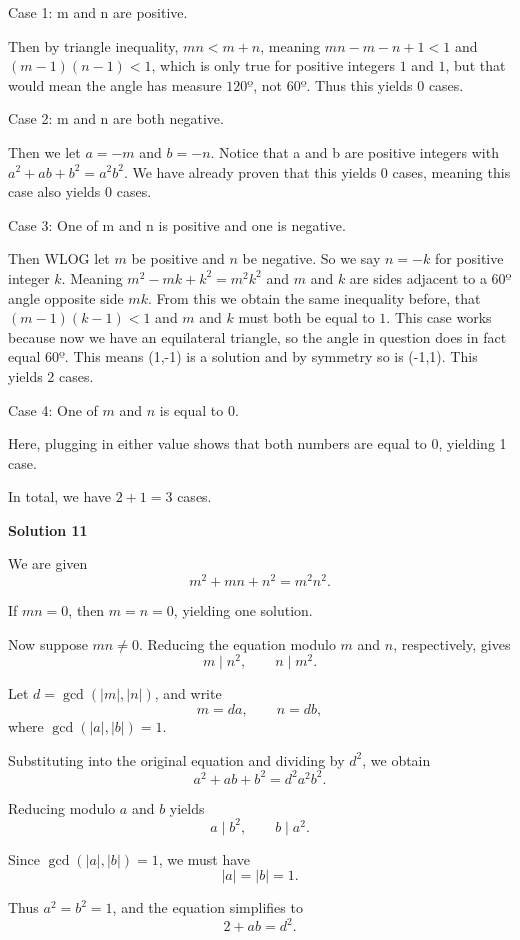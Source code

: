 \begin{enumerate}
 Case 1: m and n are positive.

 Then by triangle inequality, $mn < m + n$, meaning $mn - m - n + 1 < 1$ and $(m - 1)(n - 1) < 1$, which is only true for positive integers $1$ and $1$, but that would mean the angle has measure $120º$, not $60º$. Thus this yields $0$ cases.

 Case 2: m and n are both negative.

 Then we let $a = -m$ and $b = -n$. Notice that a and b are positive integers with $a^2 + ab + b^2 = a^2b^2$. We have already proven that this yields $0$ cases, meaning this case also yields 0 cases.

 Case 3: One of m and n is positive and one is negative.

 Then WLOG let $m$ be positive and $n$ be negative. So we say $n = -k$ for positive integer $k$. Meaning $m^2 - mk + k^2 = m^2k^2$ and $m$ and $k$ are sides adjacent to a $60º$ angle opposite side $mk$. From this we obtain the same inequality before, that $(m-1)(k-1) < 1$ and $m$ and $k$ must both be equal to $1$. This case works because now we have an equilateral triangle, so the angle in question does in fact equal $60º$. This means (1,-1) is a solution and by symmetry so is (-1,1). This yields 2 cases.

 Case 4: One of $m$ and $n$ is equal to $0$.

 Here, plugging in either value shows that both numbers are equal to $0$, yielding 1 case.

 In total, we have $2 + 1 = \boxed{3}$ cases.

 



\textbf{Solution 11}

We are given
 \[m^2+mn+n^2=m^2n^2.\]

 If $mn=0$, then $m=n=0$, yielding one solution.

 Now suppose $mn\ne 0$. Reducing the equation modulo $m$ and $n$, respectively, gives
 \[m\mid n^2,\qquad n\mid m^2.\]

 Let $d=\gcd(|m|,|n|)$, and write
 \[m=da,\qquad n=db,\]where $\gcd(|a|,|b|)=1$.

 Substituting into the original equation and dividing by $d^2$, we obtain
 \[a^2+ab+b^2=d^2a^2b^2.\]

 Reducing modulo $a$ and $b$ yields
 \[a\mid b^2,\qquad b\mid a^2.\]

 Since $\gcd(|a|,|b|)=1$, we must have
 \[|a|=|b|=1.\]

 Thus $a^2=b^2=1$, and the equation simplifies to
 \[2+ab=d^2.\]


\end{enumerate}
